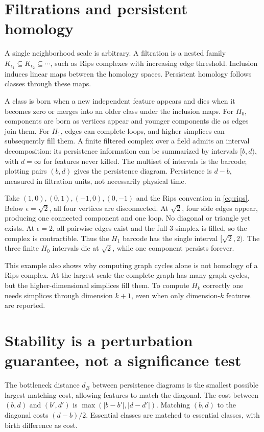\section{Filtrations and persistent homology}
A single neighborhood scale is arbitrary. A filtration is a nested family $K_{\epsilon_1}\subseteq K_{\epsilon_2}\subseteq\cdots$, such as Rips complexes with increasing edge threshold. Inclusion induces linear maps between the homology spaces. Persistent homology follows classes through these maps.

A class is born when a new independent feature appears and dies when it becomes zero or merges into an older class under the inclusion maps. For $H_0$, components are born as vertices appear and younger components die as edges join them. For $H_1$, edges can complete loops, and higher simplices can subsequently fill them. A finite filtered complex over a field admits an interval decomposition: its persistence information can be summarized by intervals $[b,d)$, with $d=\infty$ for features never killed. The multiset of intervals is the barcode; plotting pairs $(b,d)$ gives the persistence diagram. Persistence is $d-b$, measured in filtration units, not necessarily physical time.

\begin{example}\label{ex:square-persistence}
Take $(1,0),(0,1),(-1,0),(0,-1)$ and the Rips convention in \eqref{eq:rips}. Below $\epsilon=\sqrt2$, all four vertices are disconnected. At $\sqrt2$, four side edges appear, producing one connected component and one loop. No diagonal or triangle yet exists. At $\epsilon=2$, all pairwise edges exist and the full 3-simplex is filled, so the complex is contractible. Thus the $H_1$ barcode has the single interval $[\sqrt2,2)$. The three finite $H_0$ intervals die at $\sqrt2$, while one component persists forever.
\end{example}
This example also shows why computing graph cycles alone is not homology of a Rips complex. At the largest scale the complete graph has many graph cycles, but the higher-dimensional simplices fill them. To compute $H_k$ correctly one needs simplices through dimension $k+1$, even when only dimension-$k$ features are reported.

\section{Stability is a perturbation guarantee, not a significance test}
The bottleneck distance $d_B$ between persistence diagrams is the smallest possible largest matching cost, allowing features to match the diagonal. The cost between $(b,d)$ and $(b',d')$ is $\max(|b-b'|,|d-d'|)$. Matching $(b,d)$ to the diagonal costs $(d-b)/2$. Essential classes are matched to essential classes, with birth difference as cost.

